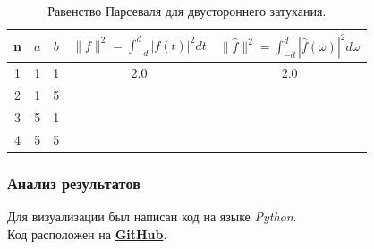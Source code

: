 \documentclass[a5paper, 10pt]{article}
\theoremstyle{definition}
\theoremstyle{plain}
\theoremstyle{remark}
\begin{document}
\begin{table}[h!]
\caption{Равенство Парсеваля для двустороннего затухания.}
\label{tabular:timesandtenses}
\begin{center}
\begin{tabular}{|c|c|c|c|c|}
\hline
n & $a$ & $b$ & $\| f \|^2 = \int_{-d}^d |f(t)|^2 dt $ & $\| \hat{f} \|^2 = \int_{-d}^d |\hat{f}(\omega)|^2 d\omega $ \\
\hline
1 & 1 & 1 &  2.0& 2.0\\
\hline
2 & 1 & 5 &  & \\
\hline
3 & 5 & 1 &  & \\
\hline
4 & 5 & 5 &  & \\
\hline
\end{tabular}
\end{center}
\end{table}



\subsubsection{Анализ результатов}




Для визуализации был написан код на языке \textit{Python}. \\
Код расположен на \href{https://github.com/a-nechaeva/practical_Linal/tree/main/lab4}{\textbf{GitHub}}.
\end{document}
